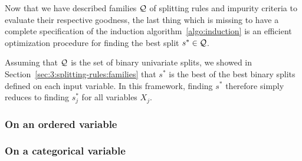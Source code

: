 Now that we have described families ${\cal Q}$ of splitting rules and impurity
criteria to evaluate their respective goodness, the last thing which is missing
to have a complete specification of the induction
algorithm~\ref{algo:induction} is an efficient optimization procedure for
finding the best split $s^* \in {\cal Q}$.

Assuming that ${\cal Q}$ is the set of binary univariate splits, we showed in
Section~\ref{sec:3:splitting-rules:families} that $s^*$ is the best of the best
binary splits defined on each input variable. In this framework, finding $s^*$
therefore simply reduces to finding $s^*_j$ for all variables $X_j$.

\subsubsection{On an ordered variable}
\label{sec:best-split-ordered}





\subsubsection{On a categorical variable}
\label{sec:best-split-categorical}

